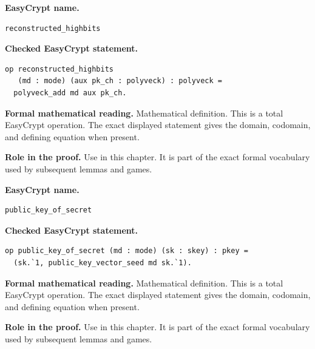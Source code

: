 \begin{formaldefinition}
\noindent\textbf{EasyCrypt name.}
\begin{lstlisting}[language=EasyCrypt,basicstyle=\ttfamily\scriptsize]
reconstructed_highbits
\end{lstlisting}
\noindent\textbf{Checked EasyCrypt statement.}
\begin{lstlisting}[language=EasyCrypt,basicstyle=\ttfamily\scriptsize]
op reconstructed_highbits
   (md : mode) (aux pk_ch : polyveck) : polyveck =
  polyveck_add md aux pk_ch.
\end{lstlisting}
\noindent\textbf{Formal mathematical reading.}
Mathematical definition. This is a total EasyCrypt operation.  The exact displayed statement gives the domain, codomain, and defining equation when present.

\noindent\textbf{Role in the proof.}
Use in this chapter. It is part of the exact formal vocabulary used by subsequent lemmas and games.

\end{formaldefinition}

\begin{formaldefinition}
\noindent\textbf{EasyCrypt name.}
\begin{lstlisting}[language=EasyCrypt,basicstyle=\ttfamily\scriptsize]
public_key_of_secret
\end{lstlisting}
\noindent\textbf{Checked EasyCrypt statement.}
\begin{lstlisting}[language=EasyCrypt,basicstyle=\ttfamily\scriptsize]
op public_key_of_secret (md : mode) (sk : skey) : pkey =
  (sk.`1, public_key_vector_seed md sk.`1).
\end{lstlisting}
\noindent\textbf{Formal mathematical reading.}
Mathematical definition. This is a total EasyCrypt operation.  The exact displayed statement gives the domain, codomain, and defining equation when present.

\noindent\textbf{Role in the proof.}
Use in this chapter. It is part of the exact formal vocabulary used by subsequent lemmas and games.

\end{formaldefinition}

